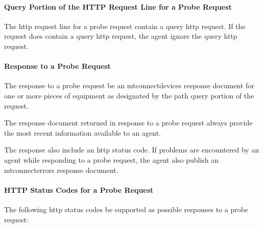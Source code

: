 \documentclass{mtconnect}	%
\begin{document}
\paragraph{Query Portion of the HTTP Request Line for a Probe Request}\mbox{}

The \gls{http request line} for a \gls{probe request} \SHOULDNOT contain a \gls{query http request}.  If the \gls{request} does contain a \gls{query http request}, the \gls{agent} \MUST ignore the \gls{query http request}.  

\paragraph{Response to a Probe Request}\mbox{}

The \gls{response} to a \gls{probe request} \SHOULD be an \gls{mtconnectdevices response document} for one or more pieces of equipment as designated by the \gls{path query} portion of the \gls{request}.

The \gls{response document} returned in response to a \gls{probe request} \MUST always provide the most recent information available to an \gls{agent}.

The \gls{response} \MUST also include an \gls{http status code}.   If problems are encountered by an \gls{agent} while responding to a \gls{probe request}, the \gls{agent} \MUST also publish an \gls{mtconnecterrors response document}.

\paragraph{HTTP Status Codes for a Probe Request}\mbox{}

The following \glspl{http status code} \MUST be supported as possible responses to a \gls{probe request}:
\end{document}
